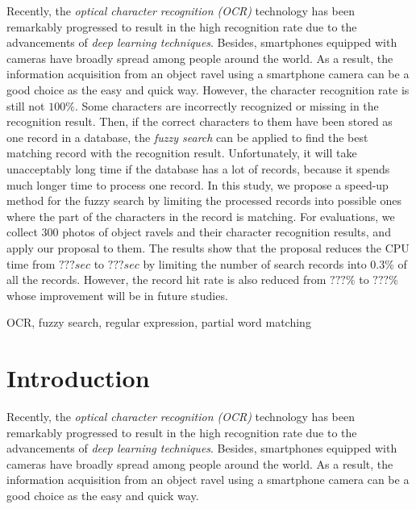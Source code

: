 \documentclass[technicalreport]{ieicej}
\begin{document}

\begin{eabstract}
    Recently, the {\em optical character recognition (OCR)} technology has been remarkably progressed to result in the high recognition rate due to the advancements of {\em deep learning techniques}. Besides, smartphones equipped with cameras have broadly spread among people around the world. As a result, the information acquisition from an object ravel using a smartphone camera can be a good choice as the easy and quick way.
    However, the character recognition rate is still not $100\%$. Some characters are incorrectly recognized or missing in the recognition result. Then, if the correct characters to them have been stored as one record in a database, the {\em fuzzy search} can be applied to find the best matching record with the recognition result. Unfortunately, it will take unacceptably long time if the database has a lot of records, because it spends much longer time to process one record. 
    In this study, we propose a speed-up method for the fuzzy search by limiting the processed records into possible ones where the part of the characters in the record is matching. 
    For evaluations, we collect 300 photos of object ravels and their character recognition results, and apply our proposal to them. The results show that the proposal reduces the CPU time from $???sec$ to $???sec$ by limiting the number of search records into 0.3\% of all the records. However, the record hit rate is also reduced from $???\%$ to $???\%$ whose improvement will be in future studies.
    
\end{eabstract}
\begin{ekeyword}
OCR, fuzzy search, regular expression, partial word matching
\end{ekeyword}
\maketitle

\section{Introduction}
    Recently, the {\em optical character recognition (OCR)} technology has been remarkably progressed to result in the high recognition rate due to the advancements of {\em deep learning techniques}. Besides, smartphones equipped with cameras have broadly spread among people around the world. As a result, the information acquisition from an object ravel using a smartphone camera can be a good choice as the easy and quick way.
\end{document}

